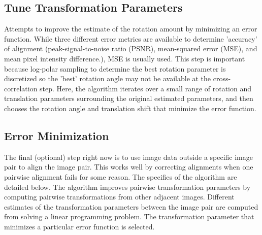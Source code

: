 \documentclass{article}
\begin{document}
\subsection{Tune Transformation Parameters}
Attempts to improve the estimate of the rotation amount by minimizing an error function. While three different error metrics are available to determine 'accuracy' of alignment (peak-signal-to-noise ratio (PSNR), mean-squared error (MSE), and mean pixel intensity difference.), MSE is usually used. This step is important because log-polar sampling to determine the best rotation parameter is discretized so the 'best' rotation angle may not be available at the cross-correlation step. Here, the algorithm iterates over a small range of rotation and translation parameters surrounding the original estimated parameters, and then chooses the rotation angle and translation shift that minimize the error function.

\subsection{Error Minimization}
The final (optional) step right now is to use image data outside a specific image pair to align the image pair. This works well by correcting alignments when one pairwise alignment fails for some reason. The specifics of the algorithm are detailed below. The algorithm improves pairwise transformation parameters by computing pairwise transformations from other adjacent images. Different estimates of the transformation parameters between the image pair are computed from solving a linear programming problem. The transformation parameter that minimizes a particular error function is selected. \\
\end{document}
